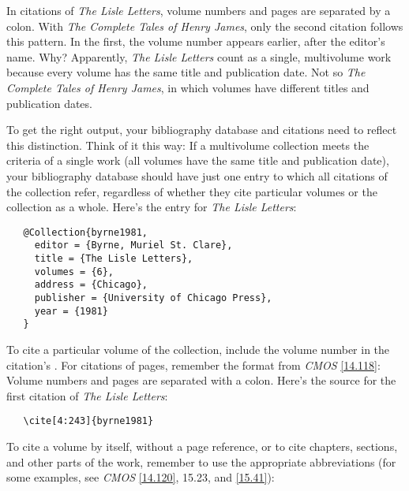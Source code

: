 \documentclass[11pt,letterpaper,oneside]{article}
\begin{document}
\begin{citeonly}
\item \cite[4:243]{byrne1981}
\item \cite*[32--33]{james1963.5}
\item \cite[4:245]{byrne1981}
\item \cite*[34]{james1963.5}
\end{citeonly}

In citations of \textit{The Lisle Letters}, volume numbers and pages
are separated by a colon. With \textit{The Complete Tales of Henry
James}, only the second citation follows this pattern. In the first,
the volume number appears earlier, after the editor's name. Why?
Apparently, \textit{The Lisle Letters} count as a single, multivolume
work because every volume has the same title and publication date. Not
so \textit{The Complete Tales of Henry James}, in which volumes have
different titles and publication dates.

To get the right output, your bibliography database and citations need
to reflect this distinction. Think of it this way: If a multivolume
collection meets the criteria of a single work (all volumes have the
same title and publication date), your bibliography database should
have just one entry to which all citations of the collection refer,
regardless of whether they cite particular volumes or the collection
as a whole. Here's the entry for \textit{The Lisle Letters}:

\begin{verbatim}
   @Collection{byrne1981,
     editor = {Byrne, Muriel St. Clare},
     title = {The Lisle Letters},
     volumes = {6},
     address = {Chicago},
     publisher = {University of Chicago Press},
     year = {1981}
   }
\end{verbatim}

To cite a particular volume of the collection, include the volume
number in the citation's . For citations of pages,
remember the format from \textit{CMOS} \ref{14.118}: Volume numbers
and pages are separated with a colon. Here's the source for the first
citation of \textit{The Lisle Letters}:

\begin{verbatim}
   \cite[4:243]{byrne1981}
\end{verbatim}

\noindent To cite a volume by itself, without a page reference, or to
cite chapters, sections, and other parts of the work, remember to use
the appropriate abbreviations (for some examples, see \textit{CMOS}
\ref{14.120}, 15.23, and \ref{15.41}):
\end{document}
